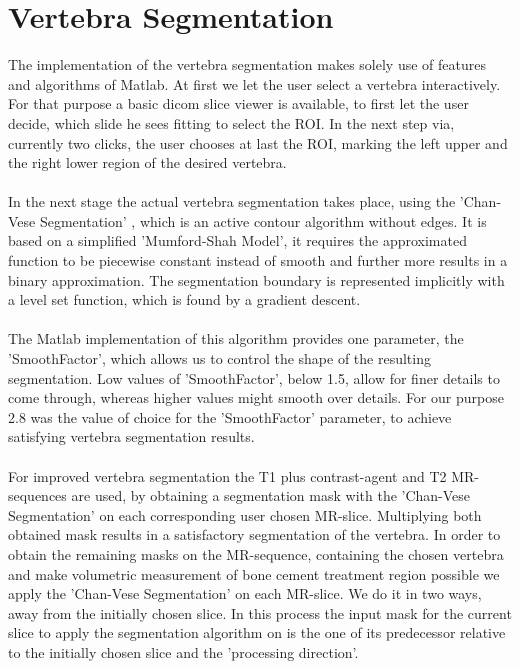 \documentclass{article}
\begin{document}
  \section{Vertebra Segmentation}
  {
  	The implementation of the vertebra segmentation makes solely use of features and algorithms
  	of Matlab. At first we let the user select a vertebra interactively. For that purpose a basic 
  	dicom slice viewer is available, to first let the user decide, which slide he sees fitting to select the ROI. In the next step via, currently two clicks, the user chooses at last the ROI, marking the left upper and the right lower region of the desired vertebra.\\
  	\\In the next stage the actual vertebra segmentation takes place, using the 'Chan-Vese Segmentation' \cite{[ChanVese01]}, which is an active contour algorithm without edges. It is based on a simplified 'Mumford-Shah Model', it requires the approximated function to be piecewise constant instead of smooth and further more results in a binary approximation. The segmentation boundary is represented implicitly with a level set function, which is found by a gradient descent. \\
  	\\ The Matlab implementation of this algorithm provides one parameter, the 'SmoothFactor', which allows us to control the shape of the resulting segmentation.
  	Low values of 'SmoothFactor', below 1.5, allow for finer details to come through, whereas higher values might smooth over details. For our purpose 2.8 was the value of choice for the 'SmoothFactor' parameter, to achieve satisfying vertebra segmentation results.\\
  	\\For improved vertebra segmentation the T1 plus contrast-agent and T2 MR-sequences are used, by obtaining a segmentation mask with the 'Chan-Vese Segmentation' \cite{[ChanVese01]} on each corresponding user chosen MR-slice. Multiplying both obtained mask results in a satisfactory segmentation of the vertebra.  
  	In order to obtain the remaining masks on the MR-sequence, containing the chosen vertebra and make volumetric measurement of bone cement treatment region possible we apply the 'Chan-Vese Segmentation' \cite{[ChanVese01]} on each MR-slice. \newline 
    We do it in two ways, away from the initially chosen slice. In this process the input mask for the current slice to apply the segmentation algorithm on is the one of its predecessor relative to the initially chosen slice and the 'processing direction'.
}
\end{document}
